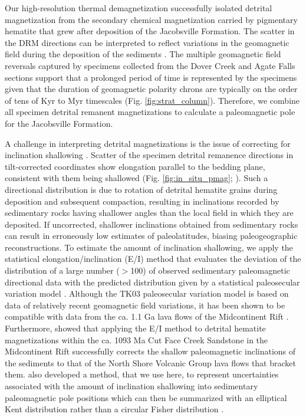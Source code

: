 Our high-resolution thermal demagnetization successfully isolated detrital magnetization from the secondary chemical magnetization carried by pigmentary hematite that grew after deposition of the Jacobsville Formation. The scatter in the DRM directions can be interpreted to reflect variations in the geomagnetic field during the deposition of the sediments \cite{Steiner1983a, Tauxe1984a}. The multiple geomagnetic field reversals captured by specimens collected from the Dover Creek and Agate Falls sections support that a prolonged period of time is represented by the specimens given that the duration of geomagnetic polarity chrons are typically on the order of tens of Kyr to Myr timescales (Fig. \ref{fig:strat_column}). Therefore, we combine all specimen detrital remanent magnetizations to calculate a paleomagnetic pole for the Jacobsville Formation.

A challenge in interpreting detrital magnetizations is the issue of correcting for inclination shallowing \cite{King1955a, Tauxe2004b, Bilardello2016b}. Scatter of the specimen detrital remanence directions in tilt-corrected coordinates show elongation parallel to the bedding plane, consistent with them being shallowed (Fig. \ref{fig:in_situ_pmag}; ). Such a directional distribution is due to rotation of detrital hematite grains during deposition and subsequent compaction, resulting in inclinations recorded by sedimentary rocks having shallower angles than the local field in which they are deposited. If uncorrected, shallower inclinations obtained from sedimentary rocks can result in erroneously low estimates of paleolatitudes, biasing paleogeographic reconstructions. To estimate the amount of inclination shallowing, we apply the statistical elongation/inclination (E/I) method that evaluates the deviation of the distribution of a large number ($>$100) of observed sedimentary paleomagnetic directional data with the predicted distribution given by a statistical paleosecular variation model \cite{Tauxe2004b}. Although the TK03 paleosecular variation model is based on data of relatively recent geomagnetic field variations, it has been shown to be compatible with data from the ca. 1.1 Ga lava flows of the Midcontinent Rift \cite{Tauxe2009a}. Furthermore,  showed that applying the E/I method to detrital hematite magnetizations within the ca. 1093 Ma Cut Face Creek Sandstone in the Midcontinent Rift successfully corrects the shallow paleomagnetic inclinations of the sediments to that of the North Shore Volcanic Group lava flows that bracket them.  also developed a method, that we use here, to represent uncertainties associated with the amount of inclination shallowing into sedimentary paleomagnetic pole positions which can then be summarized with an elliptical Kent distribution \cite{Kent1982a} rather than a circular Fisher distribution \cite{Fisher1953a}. 

